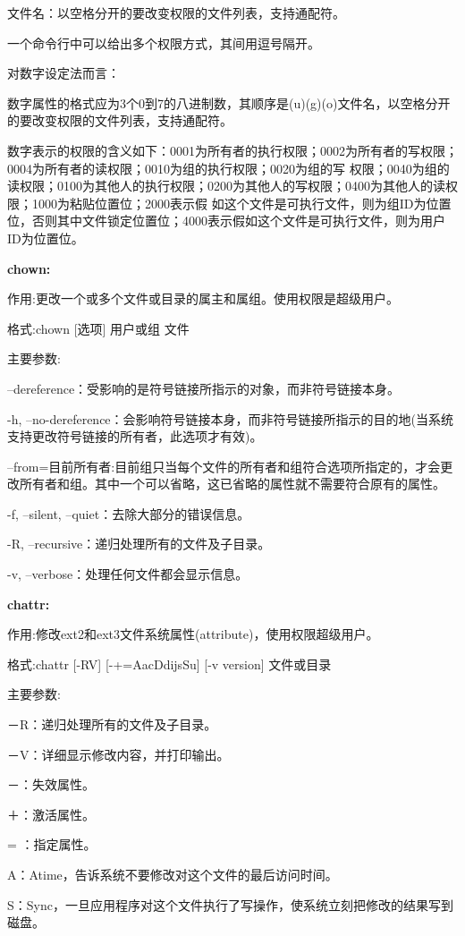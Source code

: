 文件名：以空格分开的要改变权限的文件列表，支持通配符。

一个命令行中可以给出多个权限方式，其间用逗号隔开。

对数字设定法而言：

数字属性的格式应为3个0到7的八进制数，其顺序是(u)(g)(o)文件名，以空格分开的要改变权限的文件列表，支持通配符。

数字表示的权限的含义如下：0001为所有者的执行权限；0002为所有者的写权限；0004为所有者的读权限；0010为组的执行权限；0020为组的写
权限；0040为组的读权限；0100为其他人的执行权限；0200为其他人的写权限；0400为其他人的读权限；1000为粘贴位置位；2000表示假
如这个文件是可执行文件，则为组ID为位置位，否则其中文件锁定位置位；4000表示假如这个文件是可执行文件，则为用户ID为位置位。

\textbf{chown:}

作用:更改一个或多个文件或目录的属主和属组。使用权限是超级用户。

格式:chown [选项] 用户或组 文件

主要参数:

--dereference：受影响的是符号链接所指示的对象，而非符号链接本身。

-h, --no-dereference：会影响符号链接本身，而非符号链接所指示的目的地(当系统支持更改符号链接的所有者，此选项才有效)。

--from=目前所有者:目前组只当每个文件的所有者和组符合选项所指定的，才会更改所有者和组。其中一个可以省略，这已省略的属性就不需要符合原有的属性。

-f, --silent, --quiet：去除大部分的错误信息。

-R, --recursive：递归处理所有的文件及子目录。

-v, --verbose：处理任何文件都会显示信息。

\textbf{chattr:}

作用:修改ext2和ext3文件系统属性(attribute)，使用权限超级用户。

格式:chattr [-RV] [-+=AacDdijsSu] [-v version] 文件或目录

主要参数:

－R：递归处理所有的文件及子目录。

－V：详细显示修改内容，并打印输出。

－：失效属性。

＋：激活属性。

= ：指定属性。

A：Atime，告诉系统不要修改对这个文件的最后访问时间。

S：Sync，一旦应用程序对这个文件执行了写操作，使系统立刻把修改的结果写到磁盘。

